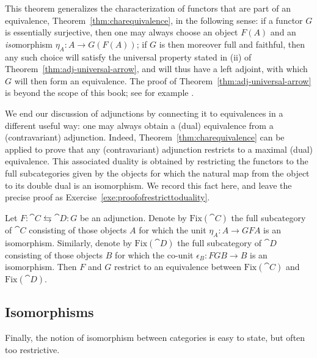%
This theorem generalizes the characterization of functors that are part of an equivalence, Theorem~\ref{thm:charequivalence}, in the following sense: if a functor $G$ is essentially surjective, then one may always choose an object $F(A)$ and an \emph{iso}morphism $\eta_A \colon A \to G(F(A))$; if $G$ is then moreover full and faithful, then any such choice will satisfy the universal property stated in (ii) of Theorem~\ref{thm:adj-universal-arrow}, and  will thus have a left adjoint, with which $G$ will then form an equivalence. The proof of Theorem~\ref{thm:adj-universal-arrow} is beyond the scope of this book; see for example \cite[Section 3.1]{Borceux1}.



We end our discussion of adjunctions by connecting it to equivalences in a different useful way: one may always obtain a (dual) equivalence from a (contravariant) adjunction. Indeed,  Theorem~\ref{thm:charequivalence} can be applied to prove that any (contravariant) adjunction restricts to a maximal (dual) equivalence. This associated duality is obtained by restricting the functors to the full subcategories given by the objects for which the natural map from the object to its double dual is an isomorphism. We record this fact here, and leave the precise proof as Exercise~\ref{exe:proofofrestricttoduality}.
\begin{corollary}\label{cor:restricttoduality}
Let $F \colon \cat{C} \leftrightarrows \cat{D} \colon G$ be an adjunction. Denote by $\mathrm{Fix}(\cat{C})$ the full subcategory of $\cat{C}$ consisting of those objects $A$ for which the unit $\eta_A \colon A \to GFA$ is an isomorphism. Similarly, denote by $\mathrm{Fix}(\cat{D})$ the full subcategory of $\cat{D}$ consisting of those objects $B$ for which the co-unit $\epsilon_B \colon FGB \to B$ is an isomorphism. Then $F$ and $G$ restrict to an equivalence between $\mathrm{Fix}(\cat{C})$ and $\mathrm{Fix}(\cat{D})$.
\end{corollary}






\subsection*{Isomorphisms}
Finally, the notion of isomorphism between categories is easy to state, but often too restrictive.

